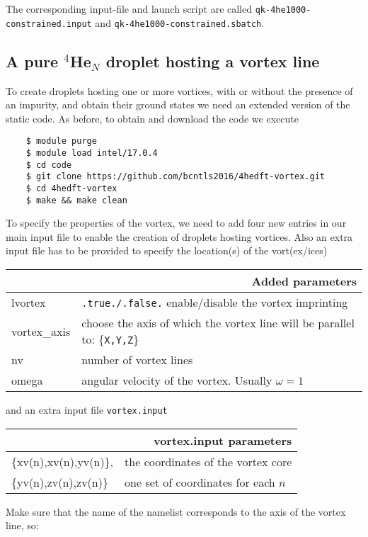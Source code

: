 \documentclass[10pt,a4paper]{article}
\begin{document}
	The corresponding input-file and launch script are called \verb|qk-4he1000-constrained.input| and \verb|qk-4he1000-constrained.sbatch|.
	
	\subsection{A pure $^4$He$_{N}$ droplet hosting a vortex line}
	To create droplets hosting one or more vortices, with or without the presence of an impurity, and obtain their ground states we need an extended version of the static code. As before, to obtain and download the code we execute
	\begin{verbatim}
	$ module purge
	$ module load intel/17.0.4
	$ cd code
	$ git clone https://github.com/bcntls2016/4hedft-vortex.git
	$ cd 4hedft-vortex
	$ make && make clean
	\end{verbatim}
	
	To specify the properties of the vortex, we need to add four new entries in our main input file to enable the creation of droplets hosting vortices. Also an extra input file has to be provided to specify the location(s) of the vort(ex/ices)
	
	\begin{center}
		\begin{tabular}{l|p{9.75cm}}
			\multicolumn{2}{r}{\textbf{Added parameters}} \\
			\hline\hline
			lvortex			&  \verb|.true./.false.| enable/disable the vortex imprinting  \\
			vortex\_axis		&	choose the axis of which the vortex line will be parallel to: \{\verb|X,Y,Z|\} \\
			nv		&	number of vortex lines \\
			omega	&	angular velocity of the vortex. Usually $\omega=1$	
		\end{tabular}
	\end{center}
	\vspace{5px}
	
	and an extra input file \verb|vortex.input|
	
	\begin{center}
		\begin{tabular}{l|p{8.0cm}}
			\multicolumn{2}{r}{\textbf{vortex.input parameters}} \\
			\hline\hline
			\{xv(n),xv(n),yv(n)\},			&  the coordinates of the vortex core  \\
			\{yv(n),zv(n),zv(n)\}		&	one set of coordinates for each $n$ \\
		\end{tabular}
	\end{center}
	\vspace{5px}
	Make sure that the name of the namelist corresponds to the axis of the vortex line, so:
	
\end{document}
